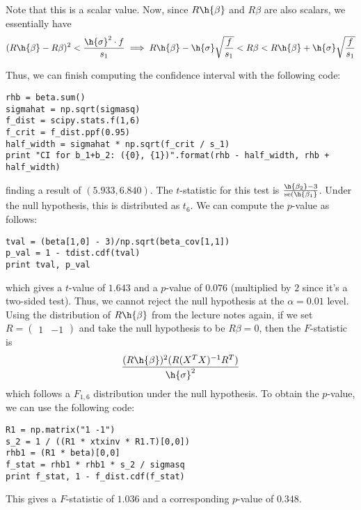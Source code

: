 \documentclass{article}
\newcommand{\openm}{\begin{pmatrix}}
\newcommand{\closem}{\end{pmatrix}}
\begin{document}
Note that this is a scalar value. Now, since $R\h{\beta}$ and $R\beta$ are also scalars, we essentially have
\[
    (R\h{\beta}-R\beta)^2<\frac{\h{\sigma}^2\cdot f}{s_1}\\
    \implies R\h{\beta}-\h{\sigma}\sqrt{\frac{f}{s_1}}<R\beta<R\h{\beta}+\h{\sigma}\sqrt{\frac{f}{s_1}}
\]

Thus, we can finish computing the confidence interval with the following code:
\begin{verbatim}
rhb = beta.sum()
sigmahat = np.sqrt(sigmasq)
f_dist = scipy.stats.f(1,6)
f_crit = f_dist.ppf(0.95)
half_width = sigmahat * np.sqrt(f_crit / s_1)
print "CI for b_1+b_2: ({0}, {1})".format(rhb - half_width, rhb + half_width)
\end{verbatim}
finding a result of $(5.933,6.840)$.
The $t$-statistic for this test is $\frac{\h{\beta_2}-3}{\text{se}(\h{\beta_1}}$. Under the null hypothesis, this is distributed as $t_6$. We can compute the $p$-value as follows:
\begin{verbatim}
tval = (beta[1,0] - 3)/np.sqrt(beta_cov[1,1])
p_val = 1 - tdist.cdf(tval)
print tval, p_val
\end{verbatim}
which gives a $t$-value of $1.643$ and a $p$-value of $0.076$ (multiplied by $2$ since it's a two-sided test). Thus, we cannot reject the null hypothesis at the $\alpha=0.01$ level.
Using the distribution of $R\h{\beta}$ from the lecture notes again, if we set $R=\openm1&-1\closem$ and take the null hypothesis to be $R\beta=0$, then the $F$-statistic is
\[\frac{(R\h{\beta})^2(R(X^TX)^{-1}R^T)}{\h{\sigma}^2}\]
which follows a $F_{1,6}$ distribution under the null hypothesis. To obtain the $p$-value, we can use the following code:
\begin{verbatim}
R1 = np.matrix("1 -1")
s_2 = 1 / ((R1 * xtxinv * R1.T)[0,0])
rhb1 = (R1 * beta)[0,0]
f_stat = rhb1 * rhb1 * s_2 / sigmasq
print f_stat, 1 - f_dist.cdf(f_stat)
\end{verbatim}
This gives a $F$-statistic of $1.036$ and a corresponding $p$-value of $0.348$.
\end{document}
